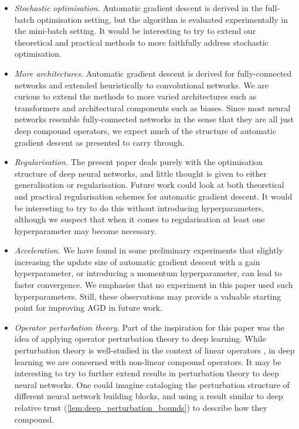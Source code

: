 \begin{itemize}[leftmargin=*]
    \item \textit{Stochastic optimisation.} Automatic gradient descent is derived in the full-batch optimisation setting, but the algorithm is evaluated experimentally in the mini-batch setting. It would be interesting to try to extend our theoretical and practical methods to more faithfully address stochastic optimisation.
    \item \textit{More architectures.} Automatic gradient descent is derived for fully-connected networks and extended heuristically to convolutional networks. We are curious to extend the methods to more varied architectures such as transformers \citep{NIPS2017_3f5ee243} and architectural components such as biases. Since most neural networks resemble fully-connected networks in the sense that they are all just deep compound operators, we expect much of the structure of automatic gradient descent as presented to carry through.
    \item \textit{Regularisation.} The present paper deals purely with the optimisation structure of deep neural networks, and little thought is given to either generalisation or regularisation. Future work could look at both theoretical and practical regularisation schemes for automatic gradient descent. It would be interesting to try to do this without introducing hyperparameters, although we suspect that when it comes to regularisation at least one hyperparameter may become necessary.
    \item \textit{Acceleration.} We have found in some preliminary experiments that slightly increasing the update size of automatic gradient descent with a gain hyperparameter, or introducing a momentum hyperparameter, can lead to faster convergence. We emphasise that no experiment in this paper used such hyperparameters. Still, these observations may provide a valuable starting point for improving AGD in future work.
    \item \textit{Operator perturbation theory.} Part of the inspiration for this paper was the idea of applying operator perturbation theory to deep learning. While perturbation theory is well-studied in the context of linear operators \citep{Weyl1912,Kato:1966:PTL,STEWART200653}, in deep learning we are concerned with non-linear compound operators. It may be interesting to try to further extend results in perturbation theory to deep neural networks. One could imagine cataloging the perturbation structure of different neural network building blocks, and using a result similar to deep relative trust (\cref{lem:deep_perturbation_bounds}) to describe how they compound.
\end{itemize}